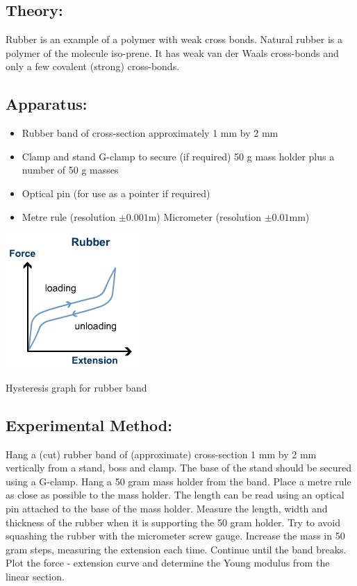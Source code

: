\documentclass{tufte-handout}
\begin{document}
\subsection{Theory:}  
Rubber is an example of a polymer with weak cross bonds. Natural rubber is a polymer of the molecule iso-prene. It has weak van der Waals cross-bonds and only a few covalent (strong) cross-bonds.   
\subsection{Apparatus:} 
\begin{itemize}
\item Rubber band of cross-section approximately 1 mm by 2 mm 
\item Clamp and stand G-clamp to secure (if required) 50 g mass holder plus a number of 50 g masses 
\item Optical pin (for use as a pointer if required) 
\item Metre rule (resolution $\pm 0.001$m) Micrometer (resolution $\pm 0.01$mm)
\end{itemize}
\begin{marginfigure}
\includegraphics{hyst.jpg}
\caption{Hysteresis graph for rubber band}
\end{marginfigure}
\subsection{Experimental Method:}  
Hang a (cut) rubber band of (approximate) cross-section 1 mm by 2 mm vertically from a stand, boss and clamp. The base of the stand should be secured using a G-clamp. Hang a 50 gram mass holder from the band. Place a metre rule as close as possible to the mass holder. The length can be read using an optical pin attached to the base of the mass holder.
Measure the length, width and thickness of the rubber when it is supporting the 50 gram holder. Try to avoid squashing the rubber with the micrometer screw gauge. Increase the mass in 50 gram steps, measuring the extension each time. Continue until the band breaks. Plot the force - extension curve and determine the Young modulus from the linear section.  
\end{document}

